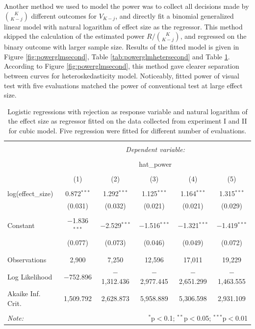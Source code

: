\documentclass{monashthesis}
\theoremstyle{definition}
\theoremstyle{definition}
\theoremstyle{definition}
\theoremstyle{definition}
\theoremstyle{remark}
\begin{document}
Another method we used to model the power was to collect all decisions made by \(K\choose{K-j}\) different outcomes for \(V_{K-j}\), and directly fit a binomial generalized linear model with natural logarithm of effect size as the regressor. This method skipped the calculation of the estimated power \(R/{K\choose{K-j}}\), and regressed on the binary outcome with larger sample size. Results of the fitted model is given in Figure \ref{fig:powerglmsecond}, Table \ref{tab:powerglmhetersecond} and Table \ref{tab:powerglmcubicsecond}. According to Figure \ref{fig:powerglmsecond}, this method gave clearer separation between curves for heteroskedasticity model. Noticeably, fitted power of visual test with five evaluations matched the power of conventional test at large effect size.

\begin{table}[!htbp] \centering 
  \caption{Logistic regressions with rejection as response variable and natural logarithm of the effect size as regressor fitted on the data collected from experiment I and II for cubic model. Five regression were fitted for different number of evaluations.} 
  \label{tab:powerglmcubicsecond} 
\begin{tabular}{@{\extracolsep{5pt}}lccccc} 
\\[-1.8ex]\hline 
\hline \\[-1.8ex] 
 & \multicolumn{5}{c}{\textit{Dependent variable:}} \\ 
\cline{2-6} 
\\[-1.8ex] & \multicolumn{5}{c}{hat\_power} \\ 
\\[-1.8ex] & (1) & (2) & (3) & (4) & (5)\\ 
\hline \\[-1.8ex] 
 log(effect\_size) & 0.872$^{***}$ & 1.292$^{***}$ & 1.125$^{***}$ & 1.164$^{***}$ & 1.315$^{***}$ \\ 
  & (0.031) & (0.032) & (0.021) & (0.021) & (0.029) \\ 
  & & & & & \\ 
 Constant & $-$1.836$^{***}$ & $-$2.529$^{***}$ & $-$1.516$^{***}$ & $-$1.321$^{***}$ & $-$1.419$^{***}$ \\ 
  & (0.077) & (0.073) & (0.046) & (0.049) & (0.072) \\ 
  & & & & & \\ 
\hline \\[-1.8ex] 
Observations & 2,900 & 7,250 & 12,596 & 17,011 & 19,229 \\ 
Log Likelihood & $-$752.896 & $-$1,312.436 & $-$2,977.445 & $-$2,651.299 & $-$1,463.555 \\ 
Akaike Inf. Crit. & 1,509.792 & 2,628.873 & 5,958.889 & 5,306.598 & 2,931.109 \\ 
\hline 
\hline \\[-1.8ex] 
\textit{Note:}  & \multicolumn{5}{r}{$^{*}$p$<$0.1; $^{**}$p$<$0.05; $^{***}$p$<$0.01} \\ 
\end{tabular} 
\end{table}
\end{document}
